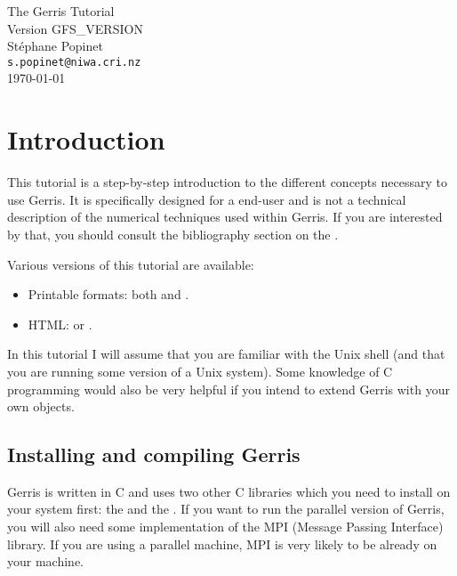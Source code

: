 \documentclass[a4paper]{article}
\begin{document}
\mbox{}\vspace{1cm}
\begin{center}
{\huge The Gerris Tutorial}\\
{\large Version GFS_VERSION}\\
\vspace{5mm}
{\large St\'ephane Popinet\\
{\tt s.popinet@niwa.cri.nz}\\
\vspace{5mm}
\today}
\vspace{1cm}
\end{center}

\tableofcontents 

\section{Introduction}

This tutorial is a step-by-step introduction to the different concepts
necessary to use Gerris. It is specifically designed for a end-user
and is not a technical description of the numerical techniques used
within Gerris. If you are interested by that, you should consult the
bibliography section on the .

Various versions of this tutorial are available:
\begin{itemize}
\item Printable formats: both  and .
\item HTML:  or
.
\end{itemize}

In this tutorial I will assume that you are familiar with the Unix
shell (and that you are running some version of a Unix system). Some
knowledge of C programming would also be very helpful if you intend to 
extend Gerris with your own objects.

\subsection{Installing and compiling Gerris}

Gerris is written in C and uses two other C libraries which you need
to install on your system first: the  and the . If you want to run the parallel version
of Gerris, you will also need some implementation of the {\sc MPI}
(Message Passing Interface) library. If you are using a parallel
machine, {\sc MPI} is very likely to be already on your machine.
\end{document}
